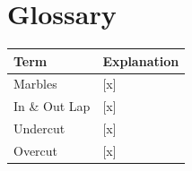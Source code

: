 \chapter{Glossary}

\begin{center}
\begin{tabular}{p{}p{}}
\textbf{Term} & \textbf{Explanation} \\ \hline
Marbles & [x] \\
In \& Out Lap & [x] \\
Undercut & [x] \\
Overcut & [x] \\
\end{tabular}
\end{center}